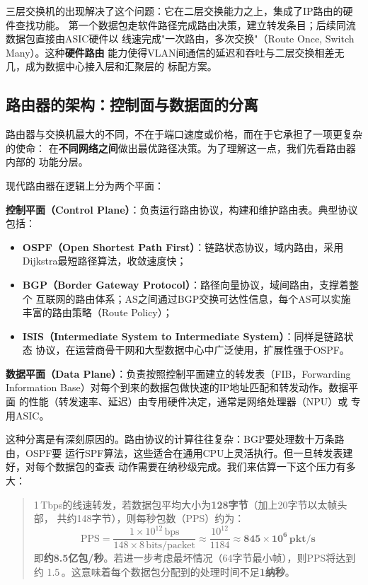 三层交换机的出现解决了这个问题：它在二层交换能力之上，集成了IP路由的硬件查找功能。
第一个数据包走软件路径完成路由决策，建立转发条目；后续同流数据包直接由ASIC硬件以
线速完成"一次路由，多次交换"（Route Once, Switch Many）。这种\textbf{硬件路由}
能力使得VLAN间通信的延迟和吞吐与二层交换相差无几，成为数据中心接入层和汇聚层的
标配方案。

\subsection{路由器的架构：控制面与数据面的分离}

路由器与交换机最大的不同，不在于端口速度或价格，而在于它承担了一项更复杂的使命：
在\textbf{不同网络之间}做出最优路径决策。为了理解这一点，我们先看路由器内部的
功能分层。

现代路由器在逻辑上分为两个平面：

\textbf{控制平面（Control Plane）}：负责运行路由协议，构建和维护路由表。典型协议包括：
\begin{itemize}
  \item \textbf{OSPF（Open Shortest Path First）}：链路状态协议，域内路由，采用
    Dijkstra最短路径算法，收敛速度快；
  \item \textbf{BGP（Border Gateway Protocol）}：路径向量协议，域间路由，支撑着整个
    互联网的路由体系；AS之间通过BGP交换可达性信息，每个AS可以实施
    丰富的路由策略（Route Policy）；
  \item \textbf{ISIS（Intermediate System to Intermediate System）}：同样是链路状态
    协议，在运营商骨干网和大型数据中心中广泛使用，扩展性强于OSPF。
\end{itemize}

\textbf{数据平面（Data Plane）}：负责按照控制平面建立的转发表（FIB，Forwarding
Information Base）对每个到来的数据包做快速的IP地址匹配和转发动作。数据平面
的性能（转发速率、延迟）由专用硬件决定，通常是网络处理器（NPU）或
专用ASIC。

这种分离是有深刻原因的。路由协议的计算往往复杂：BGP要处理数十万条路由，OSPF要
运行SPF算法，这些适合在通用CPU上灵活执行。但一旦转发表建好，对每个数据包的查表
动作需要在纳秒级完成。我们来估算一下这个压力有多大：

\begin{quote}
1\,Tbps的线速转发，若数据包平均大小为\textbf{128字节}（加上20字节以太帧头部，
共约148字节），则每秒包数（PPS）约为：
\[
\text{PPS} = \frac{1 \times 10^{12}\,\text{bps}}{148 \times 8\,\text{bits/packet}}
           \approx \frac{10^{12}}{1184} \approx \mathbf{845 \times 10^6\,\text{pkt/s}}
\]
即\textbf{约8.5亿包/秒}。若进一步考虑最坏情况（64字节最小帧），则PPS将达到约
1.5\,。这意味着每个数据包分配到的处理时间不足\textbf{1纳秒}。
\end{quote}

